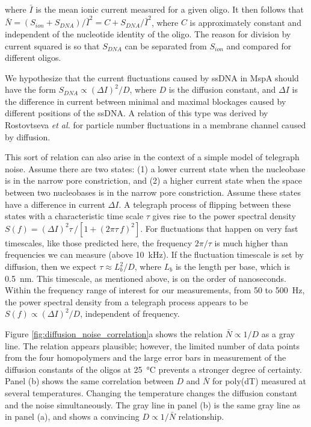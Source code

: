 \noindent
where $\bar{I}$ is the mean ionic current measured for a given oligo.  It then follows that $\bar{N} = (S_{ion}+S_{DNA})/\bar{I}^2 = C + S_{DNA}/\bar{I}^2$, where $C$ is approximately constant and independent of the nucleotide identity of the oligo.  The reason for division by current squared is so that $S_{DNA}$ can be separated from $S_{ion}$ and compared for different oligos.

We hypothesize that the current fluctuations caused by ssDNA in MspA should have the form $S_{DNA} \propto (\Delta I)^2/D$, where $D$ is the diffusion constant, and $\Delta I$ is the difference in current between minimal and maximal blockages caused by different positions of the ssDNA.  A relation of this type was derived by Rostovtseva \textit{et al.} \citep{Rostovtseva1998, Berezhkovskii2002, Rostovtseva2002} for particle number fluctuations in a membrane channel caused by diffusion.

This sort of relation can also arise in the context of a simple model of telegraph noise.  Assume there are two states: (1) a lower current state when the nucleobase is in the narrow pore constriction, and (2) a higher current state when the space between two nucleobases is in the narrow pore constriction.  Assume these states have a difference in current $\Delta I$.  A telegraph process of flipping between these states with a characteristic time scale $\tau$ gives rise to the power spectral density \citep{Dutta1981} $S(f) = (\Delta I)^2 \tau \, / \left[ 1 + (2 \pi \tau \, f)^2 \right]$.  For fluctuations that happen on very fast timescales, like those predicted here, the frequency $2\pi/\tau$ is much higher than frequencies we can measure (above \SI{10}{\kHz}).  If the fluctuation timescale is set by diffusion, then we expect $\tau \approx L_b^2 / D$, where $L_b$ is the length per base, which is \SI{0.5}{\nm}.  This timescale, as mentioned above, is on the order of nanoseconds.  Within the frequency range of interest for our measurements, from \num{50} to \SI{500}{\Hz}, the power spectral density from a telegraph process appears to be $S(f) \propto (\Delta I)^2/D$, independent of frequency.

Figure \ref{fig:diffusion_noise_correlation}a shows the relation $\bar{N} \propto 1/D$ as a gray line.  The relation appears plausible; however, the limited number of data points from the four homopolymers and the large error bars in measurement of the diffusion constants of the oligos at \SI{25}{\celsius} prevents a stronger degree of certainty.  Panel (b) shows the same correlation between $D$ and $\bar{N}$ for poly(dT) measured at several temperatures.  Changing the temperature changes the diffusion constant and the noise simultaneously.  The gray line in panel (b) is the same gray line as in panel (a), and shows a convincing $D \propto 1 / \bar{N}$ relationship.

